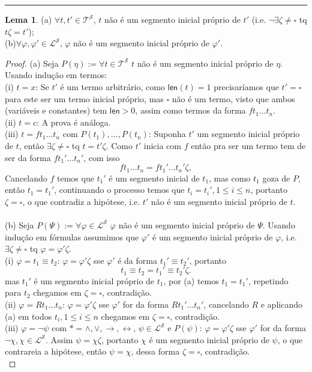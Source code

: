 \documentclass[11pt]{article}
\theoremstyle{definition}
\newtheorem{lemma}{Lema}
\newcommand{\sse}{\leftrightarrow}
\newcommand{\mc}[1]{\mathcal{#1}}
\newcommand{\msf}[1]{\mathsf{#1}}
\begin{document}
\hrule

\begin{lemma}
(a) $\forall t,t'\in\mc{T}^\mc{S}$, $t$ não é um segmento inicial próprio de $t'$ (i.e. $\neg\exists\zeta\ne\square$ tq $t\zeta=t'$);\\
(b)$\forall\varphi,\varphi'\in\mc{L}^\mc{S}$, $\varphi$ não é um segmento inicial próprio de $\varphi'$.

\begin{proof}
(a) Seja $P(\eta):=\forall t\in\mc{T}^\mc{S}$ $t$ não é um segmento inicial próprio de $\eta$. Usando indução em termos:\\
(i) $t=x$: Se $t'$ é um termo arbitrário, como $\msf{len}(t)=1$ precisaríamos que $t'=\square$ para este ser um termo inicial próprio, mas $\square$ não é um termo, visto que ambos (variáveis e constantes) tem $\msf{len}>0$, assim como termos da forma $ft_1\dots t_n$.\\
(ii) $t=c$: A prova é análoga.\\
(iii) $t=ft_1\dots t_n$ com $P(t_1),\dots,P(t_n)$: Suponha $t'$ um segmento inicial próprio de $t$, então $\exists\zeta\ne\square$ tq $t=t'\zeta$. Como $t'$ inicia com $f$ então pra ser um termo tem de ser da forma $ft_1'\dots t_n'$, com isso
\[
ft_1\dots t_n=ft_1'\dots t_n'\zeta,
\]
Cancelando $f$ temos que $t_1'$ é um segmento inicial de $t_1$, mas como $t_1$ goza de $P$, então $t_1=t_1'$, continuando o processo temos que $t_i=t_i',1\le i\le n$, portanto $\zeta=\square$, o que contradiz a hipótese, i.e. $t'$ não é um segmento inicial próprio de $t$.\\\\
(b) Seja $P(\Psi):=\forall\varphi\in\mc{L}^\mc{S}$ $\varphi$ não é um segmento inicial próprio de $\Psi$. Usando indução em fórmulas assumimos que $\varphi'$ é um segmento inicial próprio de $\varphi$, i.e. $\exists\zeta\ne\square$ tq $\varphi=\varphi'\zeta$.\\
(i) $\varphi=t_1\equiv t_2$: $\varphi=\varphi'\zeta$ sse $\varphi'$ é da forma $t_1'\equiv t_2'$, portanto
\[
t_1\equiv t_2=t_1'\equiv t_2'\zeta.
\]
mas $t_1'$ é um segmento inicial próprio de $t_1$, por (a) temos $t_1=t_1'$, repetindo para $t_2$ chegamos em $\zeta=\square$, contradição.\\
(ii) $\varphi=Rt_1\dots t_n$: $\varphi=\varphi'\zeta$ sse $\varphi'$ for da forma $Rt_1'\dots t_n'$, cancelando $R$ e aplicando (a) em todos $t_i,1\le i\le n$ chegamos em $\zeta=\square$, contradição.\\
(iii) $\varphi=\neg\psi$ com $*=\wedge,\vee,\to,\sse$, $\psi\in\mc{L}^\mc{S}$ e $P(\psi)$: $\varphi=\varphi'\zeta$ sse $\varphi'$ for da forma $\neg\chi,\chi\in\mc{L}^\mc{S}$. Assim $\psi=\chi\zeta$, portanto $\chi$ é um segmento inicial próprio de $\psi$, o que contrareia a hipótese, então $\psi=\chi$, dessa forma $\zeta=\square$, contradição.\\

\end{proof}
\end{lemma}
\end{document}
